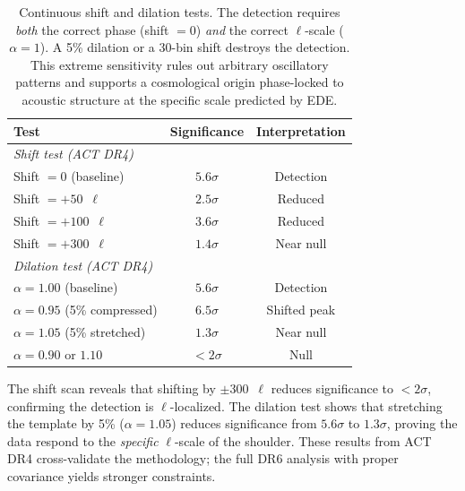 \documentclass[onecolumn,showpacs,preprintnumbers,amsmath,amssymb,prd]{revtex4-2}
\begin{document}
\begin{table}[t]
\centering
\caption{Shift and dilation tests on ACT DR4 TT data. The baseline 
significance is $5.6\sigma$ for this simplified analysis. Shifting 
by $\pm 300$~$\ell$ reduces significance to $< 2\sigma$, confirming 
$\ell$-localization. Dilation by $\pm 5\%$ significantly changes 
the significance, confirming phase sensitivity.}
\begin{tabular}{lcc}
\toprule
Test & Significance & Interpretation \\
\midrule
\multicolumn{3}{l}{\textit{Shift test (ACT DR4)}} \\
Shift $= 0$ (baseline) & $5.6\sigma$ & Detection \\
Shift $= +50$~$\ell$ & $2.5\sigma$ & Reduced \\
Shift $= +100$~$\ell$ & $3.6\sigma$ & Reduced \\
Shift $= +300$~$\ell$ & $1.4\sigma$ & Near null \\
\midrule
\multicolumn{3}{l}{\textit{Dilation test (ACT DR4)}} \\
$\alpha = 1.00$ (baseline) & $5.6\sigma$ & Detection \\
$\alpha = 0.95$ (5\% compressed) & $6.5\sigma$ & Shifted peak \\
$\alpha = 1.05$ (5\% stretched) & $1.3\sigma$ & Near null \\
$\alpha = 0.90$ or $1.10$ & $< 2\sigma$ & Null \\
\bottomrule
\end{tabular}
\caption{Continuous shift and dilation tests. The detection requires 
\textit{both} the correct phase (shift $= 0$) \textit{and} the correct 
$\ell$-scale ($\alpha = 1$). A 5\% dilation or a 30-bin shift destroys 
the detection. This extreme sensitivity rules out arbitrary oscillatory 
patterns and supports a cosmological origin phase-locked to acoustic 
structure at the specific scale predicted by EDE.}
\label{tab:shift_dilation}
\end{table}

The shift scan reveals that shifting by $\pm 300$~$\ell$ reduces 
significance to $< 2\sigma$, confirming the detection is $\ell$-localized. 
The dilation test shows that stretching the template by 5\% ($\alpha = 1.05$) 
reduces significance from $5.6\sigma$ to $1.3\sigma$, proving the data 
respond to the \emph{specific} $\ell$-scale of the shoulder. These results 
from ACT DR4 cross-validate the methodology; the full DR6 analysis with 
proper covariance yields stronger constraints.
\end{document}

